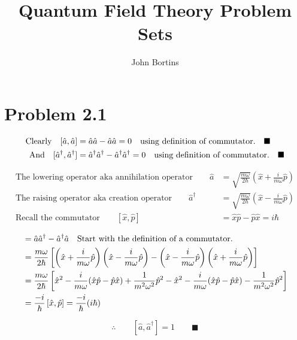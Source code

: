 \documentclass{amsart}
\title{Quantum Field Theory Problem Sets}
\author{John Bortins}
\begin{document}
 
\maketitle{}
 
\section*{Problem 2.1}

\begin{align*}
    \qq*{Clearly} [\hat{a},\hat{a}]  &= \hat{a}\hat{a}-\hat{a}\hat{a}=0\qq{using definition of commutator.}\blacksquare \\
    \qq*{And} [\hat{a}^\dagger,\hat{a}^\dagger]  &= \hat{a}^\dagger\hat{a}^\dagger-\hat{a}^\dagger\hat{a}^\dagger=0\qq{using definition of commutator.}\blacksquare 
\end{align*}

\begin{align*}
    \text{The lowering operator aka annihilation operator}\qquad\hat{a}  &= \sqrt{\frac{m\omega}{2\hbar}}\left(\hat{x} + \frac{i}{m\omega}\hat{p}\right) \\
    \text{The raising operator aka creation operator}\qquad\hat{a}^\dagger  &= \sqrt{\frac{m\omega}{2\hbar}}\left(\hat{x} - \frac{i}{m\omega}\hat{p}\right)\\
    \text{Recall the commutator}\qquad[\hat{x},\hat{p}]  &= \hat{x}\hat{p}-\hat{p}\hat{x}=i\hbar
\end{align*}

\begin{align*}
    [\hat{a},\hat{a}^\dagger] &= \hat{a}\hat{a}^\dagger-\hat{a}^\dagger\hat{a}\qq{Start with the definition of a commutator.}\\
    &= \frac{m\omega}{2\hbar}\left[\left(\hat{x} + \frac{i}{m\omega}\hat{p}\right)\left(\hat{x} - \frac{i}{m\omega}\hat{p}\right)-\left(\hat{x} - \frac{i}{m\omega}\hat{p}\right)\left(\hat{x} + \frac{i}{m\omega}\hat{p}\right)\right]\\
    &= \frac{m\omega}{2\hbar}\left[\hat{x}^2 - \frac{i}{m\omega}(\hat{x}\hat{p}-\hat{p}\hat{x}) + \frac{1}{m^2\omega^2}\hat{p}^2-\hat{x}^2 - \frac{i}{m\omega}(\hat{x}\hat{p}-\hat{p}\hat{x}) - \frac{1}{m^2\omega^2}\hat{p}^2\right]\\
    &= \frac{-i}{\hbar}\left[ \hat{x},\hat{p}\right]= \frac{-i}{\hbar} (i\hbar)\\
\end{align*}  

  \[\therefore\qquad[\hat{a},\hat{a}^\dagger] =1 \qquad\blacksquare\]
  
\end{document}
